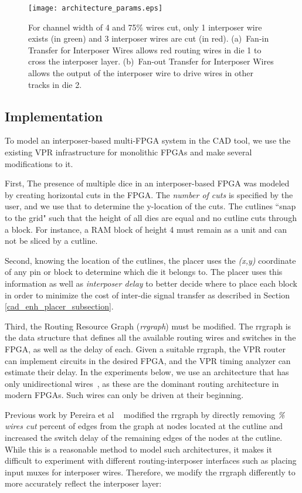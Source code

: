 \documentclass{sig-alternate-2013}
\begin{document}
\begin{figure}[!htbp]
\centering
\texttt{[image: architecture\_params.eps]}
\caption{For channel width of 4 and 75\% wires cut, only 1 interposer wire exists (in green) and 3 interposer wires are cut (in red). (a)~Fan-in Transfer for Interposer Wires allows red routing wires in die 1  to cross the interposer layer. (b)~Fan-out Transfer for Interposer Wires allows the output of the interposer wire to drive wires in other tracks in die 2.}
\label{fig:architecture_params}
\end{figure}



\subsection{Implementation}
To model an interposer-based multi-FPGA system in the CAD tool, we use the existing VPR infrastructure for monolithic FPGAs and make several modifications to it.

First, The presence of multiple dice in an interposer-based FPGA was modeled by creating horizontal cuts in the FPGA. The \textit{number of cuts} is specified by the user, and we use that to determine the y-location of the cuts. The cutlines ``snap to the grid" such that the height of all dies are equal and no cutline cuts through a block. For instance, a RAM block of height 4 must remain as a unit and can not be sliced by a cutline.

Second, knowing the location of the cutlines, the placer uses the \textit{(x,y)} coordinate of any pin or block to determine which die it belongs to. The placer uses this information as well as \textit{interposer delay} to better decide where to place each block in order to minimize the cost of inter-die signal transfer as described in Section \ref{cad_enh_placer_subsection}.

Third, the Routing Resource Graph (\textit{rrgraph}) must be modified. The rrgraph is the data structure that defines all the available routing wires and switches in the FPGA, as well as the delay of each. Given a suitable rrgraph, the VPR router can implement circuits in the desired FPGA, and the VPR timing analyzer can estimate their delay. In the experiments below, we use an architecture that has only unidirectional wires~\cite{unidirectional}, as these are the dominant routing architecture in modern FPGAs. Such wires can only be driven at their beginning. 

Previous work by Pereira et al ~\cite{hahn2014cad} modified the rrgraph by directly removing \textit{\% wires cut} percent of edges from the graph at nodes located at the cutline and increased the switch delay of the remaining edges of the nodes at the cutline. While this is a reasonable method to model such architectures, it makes it difficult to experiment with different routing-interposer interfaces such as placing input muxes for interposer wires. Therefore, we modify the rrgraph differently to more accurately reflect the interposer layer:
\end{document}
